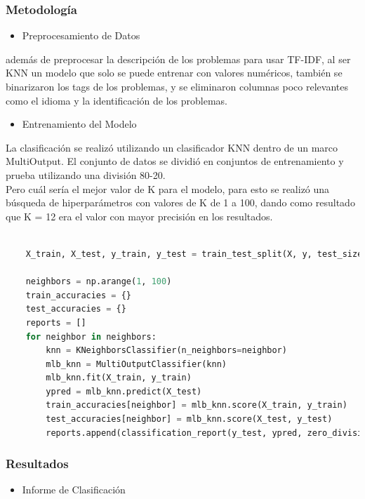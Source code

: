 \documentclass{article}
\begin{document}
\subsubsection{Metodología}
\begin{itemize}
    \item Preprocesamiento de Datos
\end{itemize}
además de preprocesar la descripción de los problemas para usar TF-IDF, al ser KNN un modelo que solo se puede entrenar con valores numéricos, también se binarizaron los tags de los problemas, y se eliminaron columnas poco relevantes como el idioma y la identificación de los problemas.

\begin{itemize}
    \item Entrenamiento del Modelo
\end{itemize}
La clasificación se realizó utilizando un clasificador KNN dentro de un marco MultiOutput. El conjunto de datos se dividió en conjuntos de entrenamiento y prueba utilizando una división 80-20.\\ 
Pero cuál sería el mejor valor de K para el modelo, para esto se realizó una búsqueda de hiperparámetros con valores de K de 1 a 100, dando como resultado que K = 12 era el valor con mayor precisión en los resultados.

\begin{lstlisting}[language=Python, caption=KNN]
    
    X_train, X_test, y_train, y_test = train_test_split(X, y, test_size=0.2, random_state=42)
    
    neighbors = np.arange(1, 100)
    train_accuracies = {}
    test_accuracies = {}
    reports = []
    for neighbor in neighbors:
        knn = KNeighborsClassifier(n_neighbors=neighbor)
        mlb_knn = MultiOutputClassifier(knn)
        mlb_knn.fit(X_train, y_train)
        ypred = mlb_knn.predict(X_test) 
        train_accuracies[neighbor] = mlb_knn.score(X_train, y_train)
        test_accuracies[neighbor] = mlb_knn.score(X_test, y_test)
        reports.append(classification_report(y_test, ypred, zero_division = 0))
    \end{lstlisting}

\subsubsection{Resultados}
\begin{itemize}
    \item Informe de Clasificación
\end{itemize}
\end{document}
